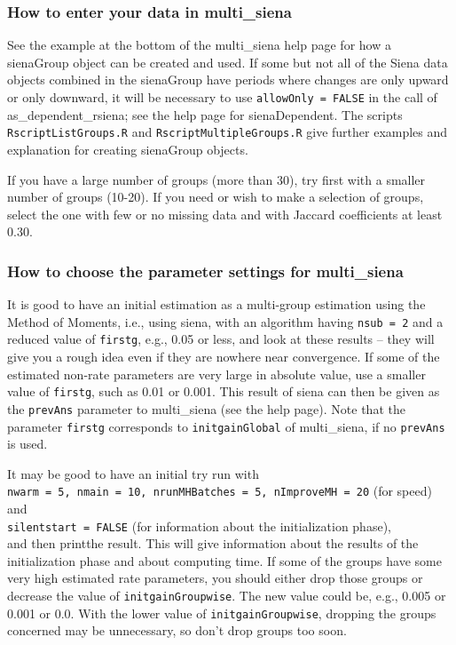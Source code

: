\documentclass[a4paper,fleqn,11pt]{article}
\newcommand{\+}{\, + \,}
\newcommand{\sfn}[1]{\textsf{#1}}
\begin{document}
\subsubsection{How to enter your data in multi\_siena}

See the example at the bottom of the \textsf{multi\_siena} help page for how a
\sfn{sienaGroup} object can be created and used.
If some but not all of the Siena data objects combined in the \sfn{sienaGroup} have
periods where changes are only upward or only downward,
it will be necessary to use \texttt{allowOnly = FALSE} in the call of
\textsf{as\_dependent\_rsiena}; see the help page for \textsf{sienaDependent}.
The scripts \texttt{RscriptListGroups.R} and \texttt{RscriptMultipleGroups.R}
give further examples and explanation for creating \sfn{sienaGroup} objects.

If you have a large number of groups (more than 30), try first
with a smaller number of groups (10-20). If you need or wish to
make a selection of groups, select the one with few or no missing data and
with Jaccard coefficients at least 0.30.

\subsubsection{How to choose the parameter settings for multi\_siena}
\label{S_multi_sienaParameters}

It is good to have an initial estimation as a multi-group estimation
using the Method of Moments, i.e., using \textsf{siena}, with
an algorithm having
\texttt{nsub = 2} and a reduced value of \texttt{firstg}, e.g.,
0.05 or less, and look at these results --
they will give you a rough idea even if they are nowhere near convergence.
If some of the estimated non-rate parameters are very large
in absolute value, use a smaller value of \texttt{firstg}, such as 0.01 or 0.001.
This result of  \textsf{siena} can then be given as the \texttt{prevAns}
parameter to \textsf{multi\_siena} (see the help page).
Note that the parameter \texttt{firstg} corresponds to \texttt{initgainGlobal}
of \textsf{multi\_siena}, if no  \texttt{prevAns} is used.

It may be good to have an initial try run with\\
\texttt{nwarm = 5, nmain = 10, nrunMHBatches = 5, nImproveMH = 20}
(for speed) \\
and \\
\texttt{silentstart = FALSE} (for information about the
initialization phase),\\
and then \textsf{print}the result.
This will give information about the results of the initialization
phase and about computing time. If some of the groups have some very
high estimated rate parameters, you should either drop those groups
or decrease the value of \texttt{initgainGroupwise}.
The new value could be, e.g., 0.005 or 0.001 or 0.0. With the lower value
of \texttt{initgainGroupwise}, dropping the groups concerned may be unnecessary,
so don't drop groups too soon.
\end{document}
